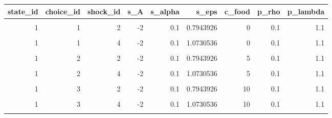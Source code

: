\documentclass[
]{book}
\begin{document}
\begin{table}[!h]
\centering
\begin{tabular}{r|r|r|r|r|r|r|r|r}
\hline
state\_id & choice\_id & shock\_id & s\_A & s\_alpha & s\_eps & c\_food & p\_rho & p\_lambda\\
\hline
\cellcolor{gray!6}{1} & \cellcolor{gray!6}{1} & \cellcolor{gray!6}{1} & \cellcolor{gray!6}{-2} & \cellcolor{gray!6}{0.1} & \cellcolor{gray!6}{0.5709374} & \cellcolor{gray!6}{0} & \cellcolor{gray!6}{0.1} & \cellcolor{gray!6}{1.1}\\
\hline
1 & 1 & 2 & -2 & 0.1 & 0.7943926 & 0 & 0.1 & 1.1\\
\hline
\cellcolor{gray!6}{1} & \cellcolor{gray!6}{1} & \cellcolor{gray!6}{3} & \cellcolor{gray!6}{-2} & \cellcolor{gray!6}{0.1} & \cellcolor{gray!6}{4.7526783} & \cellcolor{gray!6}{0} & \cellcolor{gray!6}{0.1} & \cellcolor{gray!6}{1.1}\\
\hline
1 & 1 & 4 & -2 & 0.1 & 1.0730536 & 0 & 0.1 & 1.1\\
\hline
\cellcolor{gray!6}{1} & \cellcolor{gray!6}{2} & \cellcolor{gray!6}{1} & \cellcolor{gray!6}{-2} & \cellcolor{gray!6}{0.1} & \cellcolor{gray!6}{0.5709374} & \cellcolor{gray!6}{5} & \cellcolor{gray!6}{0.1} & \cellcolor{gray!6}{1.1}\\
\hline
1 & 2 & 2 & -2 & 0.1 & 0.7943926 & 5 & 0.1 & 1.1\\
\hline
\cellcolor{gray!6}{1} & \cellcolor{gray!6}{2} & \cellcolor{gray!6}{3} & \cellcolor{gray!6}{-2} & \cellcolor{gray!6}{0.1} & \cellcolor{gray!6}{4.7526783} & \cellcolor{gray!6}{5} & \cellcolor{gray!6}{0.1} & \cellcolor{gray!6}{1.1}\\
\hline
1 & 2 & 4 & -2 & 0.1 & 1.0730536 & 5 & 0.1 & 1.1\\
\hline
\cellcolor{gray!6}{1} & \cellcolor{gray!6}{3} & \cellcolor{gray!6}{1} & \cellcolor{gray!6}{-2} & \cellcolor{gray!6}{0.1} & \cellcolor{gray!6}{0.5709374} & \cellcolor{gray!6}{10} & \cellcolor{gray!6}{0.1} & \cellcolor{gray!6}{1.1}\\
\hline
1 & 3 & 2 & -2 & 0.1 & 0.7943926 & 10 & 0.1 & 1.1\\
\hline
\cellcolor{gray!6}{1} & \cellcolor{gray!6}{3} & \cellcolor{gray!6}{3} & \cellcolor{gray!6}{-2} & \cellcolor{gray!6}{0.1} & \cellcolor{gray!6}{4.7526783} & \cellcolor{gray!6}{10} & \cellcolor{gray!6}{0.1} & \cellcolor{gray!6}{1.1}\\
\hline
1 & 3 & 4 & -2 & 0.1 & 1.0730536 & 10 & 0.1 & 1.1\\
\hline
\cellcolor{gray!6}{2} & \cellcolor{gray!6}{1} & \cellcolor{gray!6}{1} & \cellcolor{gray!6}{2} & \cellcolor{gray!6}{0.9} & \cellcolor{gray!6}{0.5709374} & \cellcolor{gray!6}{0} & \cellcolor{gray!6}{0.1} & \cellcolor{gray!6}{1.1}\\

\end{tabular}
\end{table}
\end{document}

